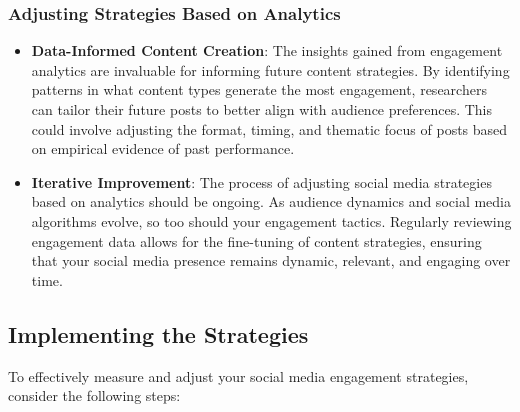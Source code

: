 \documentclass[
]{book}
\begin{document}
\hypertarget{adjusting-strategies-based-on-analytics}{%
\subsubsection*{Adjusting Strategies Based on Analytics}\label{adjusting-strategies-based-on-analytics}}

\begin{itemize}
\item
  \textbf{Data-Informed Content Creation}: The insights gained from engagement analytics are invaluable for informing future content strategies. By identifying patterns in what content types generate the most engagement, researchers can tailor their future posts to better align with audience preferences. This could involve adjusting the format, timing, and thematic focus of posts based on empirical evidence of past performance.
\item
  \textbf{Iterative Improvement}: The process of adjusting social media strategies based on analytics should be ongoing. As audience dynamics and social media algorithms evolve, so too should your engagement tactics. Regularly reviewing engagement data allows for the fine-tuning of content strategies, ensuring that your social media presence remains dynamic, relevant, and engaging over time.
\end{itemize}

\hypertarget{implementing-the-strategies-2}{%
\subsection*{Implementing the Strategies}\label{implementing-the-strategies-2}}

To effectively measure and adjust your social media engagement strategies, consider the following steps:
\end{document}
